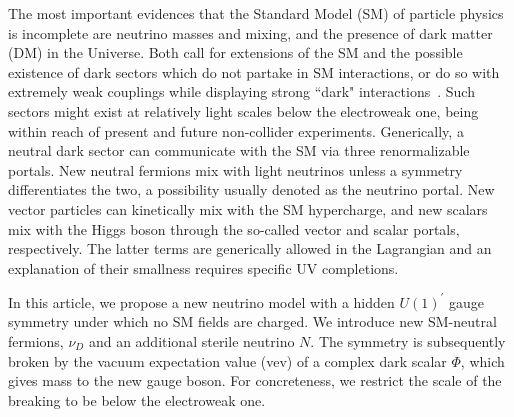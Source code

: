 \graphicspath{{}{dark_nus/}}

The most important evidences that the Standard Model (SM) of particle physics is incomplete are neutrino masses and mixing, and the presence of dark matter (DM) in the Universe. Both call for extensions of the SM and the possible existence of dark sectors which do not partake in SM interactions, or do so with extremely weak couplings while displaying strong ``dark" interactions~\cite{Boehm:2003hm,*Boehm:2003ha,Alexander:2016aln}.
Such sectors might exist at relatively light scales below the electroweak one, being within reach of present and future non-collider experiments. Generically, a neutral dark sector can communicate with the SM via three renormalizable portals. New neutral fermions mix with light neutrinos unless a symmetry differentiates the two, a possibility usually denoted as the neutrino portal. New vector particles can kinetically mix with the SM hypercharge, and new scalars mix with the Higgs boson through the so-called vector and scalar portals, respectively. The latter terms are generically allowed in the Lagrangian and an explanation of their smallness requires specific UV completions.  

In this article, we propose a new neutrino model with a hidden $U(1)^\prime$ gauge symmetry under which no SM fields are charged. We introduce new SM-neutral fermions, $\nu_D$ and an additional sterile neutrino $N$. The symmetry is subsequently broken by the vacuum expectation value (vev) of a complex dark scalar $\Phi$, which gives mass to the new gauge boson. For concreteness, we restrict the scale of the breaking to be below the electroweak one. 

